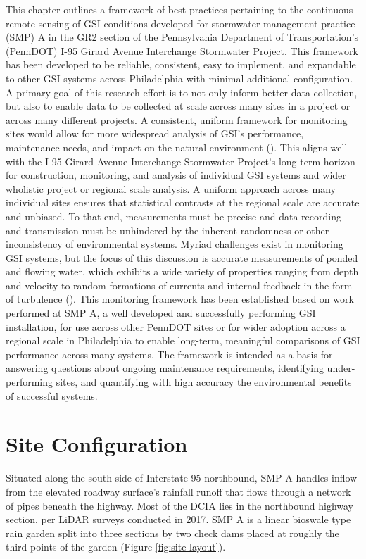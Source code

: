 This chapter outlines a framework of best practices pertaining to the continuous remote sensing of GSI conditions developed for stormwater management practice (SMP) A in the GR2 section of the Pennsylvania Department of Transportation's (PennDOT) I-95 Girard Avenue Interchange Stormwater Project.
This framework has been developed to be reliable, consistent, easy to implement, and expandable to other GSI systems across Philadelphia with minimal additional configuration.
A primary goal of this research effort is to not only inform better data collection, but also to enable data to be collected at scale across many sites in a project or across many different projects.
A consistent, uniform framework for monitoring sites would allow for more widespread analysis of GSI's performance, maintenance needs, and impact on the natural environment (\cite{Burcin2014}).
This aligns well with the I-95 Girard Avenue Interchange Stormwater Project's long term horizon for construction, monitoring, and analysis of individual GSI systems and wider wholistic project or regional scale analysis.
A uniform approach across many individual sites ensures that statistical contrasts at the regional scale are accurate and unbiased.
To that end, measurements must be precise and data recording and transmission must be unhindered by the inherent randomness or other inconsistency of environmental systems.
Myriad challenges exist in monitoring GSI systems, but the focus of this discussion is accurate measurements of ponded and flowing water, which exhibits a wide variety of properties ranging from depth and velocity to random formations of currents and internal feedback in the form of turbulence (\cite{mays2010water}).
This monitoring framework has been established based on work performed at SMP A, a well developed and successfully performing GSI installation, for use across other PennDOT sites or for wider adoption across a regional scale in Philadelphia to enable long-term, meaningful comparisons of GSI performance across many systems.
The framework is intended as a basis for answering questions about ongoing maintenance requirements, identifying under-performing sites, and quantifying with high accuracy the environmental benefits of successful systems.

\section{Site Configuration}
Situated along the south side of Interstate 95 northbound, SMP A handles inflow from the elevated roadway surface's rainfall runoff that flows through a network of pipes beneath the highway.
Most of the DCIA lies in the northbound highway section, per LiDAR surveys conducted in 2017.
SMP A is a linear bioswale type rain garden split into three sections by two check dams placed at roughly the third points of the garden (Figure \ref{fig:site-layout}).

